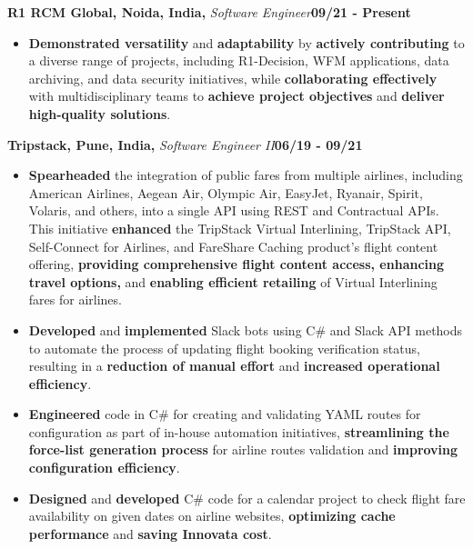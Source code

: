 \documentclass{article}
\newcommand{\subheading}[1]{\textbf{#1}}
\newenvironment{workexp}[3]{%
  \noindent\subheading{#1,} \textit{#2}\hfill\textbf{#3}\par%
}{\bigskip}
\begin{document}
\begin{workexp}{R1 RCM Global, Noida, India}{Software Engineer}{09/21 - Present}
\begin{itemize}[left=0pt, align=left]
		\item \textbf{Demonstrated versatility} and \textbf{adaptability} by
		      \textbf{actively contributing} to a diverse range of projects,
		      including R1-Decision, WFM applications, data archiving, and
		      data security initiatives, while
		      \textbf{collaborating effectively} with multidisciplinary
		      teams to \textbf{achieve project objectives} and
		      \textbf{deliver high-quality solutions}.
	\end{itemize}
\end{workexp}

\begin{workexp}{Tripstack, Pune, India}{Software Engineer II}{06/19 - 09/21}
	\begin{itemize}[left=0pt, align=left]
		\item \textbf{Spearheaded} the integration of public fares from
		      multiple airlines, including American Airlines, Aegean Air,
		      Olympic Air, EasyJet, Ryanair, Spirit, Volaris, and others,
		      into a single API using REST and Contractual APIs. This
		      initiative \textbf{enhanced} the TripStack Virtual
		      Interlining, TripStack API, Self-Connect for Airlines, and
		      FareShare Caching product's flight content offering,
		      \textbf{providing comprehensive flight content access, enhancing
		      travel options,}
		      and \textbf{enabling efficient retailing}
		      of Virtual Interlining fares for airlines.
		          
		\item \textbf{Developed} and \textbf{implemented} Slack bots using C\#
		      and Slack API methods to automate the process of updating
		      flight booking verification status, resulting in a
		      \textbf{reduction of manual effort}
		      and \textbf{increased operational efficiency}.
		          
		\item \textbf{Engineered} code in C\# for creating and validating
		      YAML routes for configuration as part of in-house automation
		      initiatives, \textbf{streamlining the force-list generation process}
		      for airline routes validation and
		      \textbf{improving configuration efficiency}.
		          
		\item \textbf{Designed} and \textbf{developed} C\# code for a calendar
		      project to check flight fare availability on given dates on
		      airline websites, \textbf{optimizing cache performance}
		      and \textbf{saving Innovata cost}.
	\end{itemize}
\end{workexp}
\end{document}
